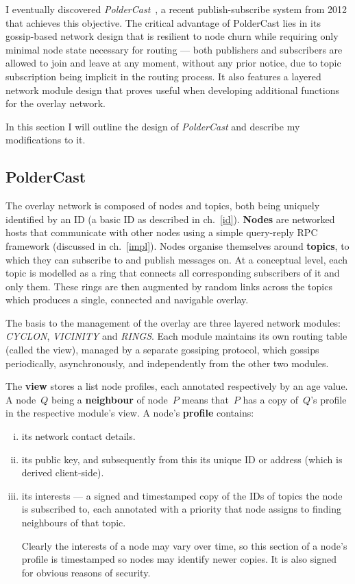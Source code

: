 \documentclass[10pt,a4paper,onecolumn]{article}
\begin{document}
I eventually discovered \textit{PolderCast}~\cite{poldercast}, a recent publish-subscribe system from 2012 that achieves this objective. The critical advantage of PolderCast lies in its gossip-based network design that is resilient to node churn while requiring only minimal node state necessary for routing — both publishers and subscribers are allowed to join and leave at any moment, without any prior notice, due to topic subscription being implicit in the routing process. It also features a layered network module design that proves useful when developing additional functions for the overlay network.

In this section I will outline the design of \textit{PolderCast} and describe my modifications to it.

\subsection{PolderCast}
The overlay network is composed of nodes and topics, both being uniquely identified by an ID (a basic ID as described in ch.~\ref{id}). \textbf{Nodes} are networked hosts that communicate with other nodes using a simple query-reply RPC framework (discussed in ch.~\ref{impl}). Nodes organise themselves around \textbf{topics}, to which they can subscribe to and publish messages on. At a conceptual level, each topic is modelled as a ring that connects all corresponding subscribers of it and only them. These rings are then augmented by random links across the topics which produces a single, connected and navigable overlay. 

The basis to the management of the overlay are three layered network modules: \emph{CYCLON}, \emph{VICINITY} and \emph{RINGS}. Each module maintains its own routing table (called the view), managed by a separate gossiping protocol, which gossips periodically, asynchronously, and independently from the other two modules.

The \textbf{view} stores a list node profiles, each annotated respectively by an age value. A node~$Q$ being a \textbf{neighbour} of node~$P$ means that~$P$ has a copy of~$Q$'s profile in the respective module's view. A node's \textbf{profile} contains:
\begin{enumerate}[i.]
\item its network contact details.
\item its public key, and subsequently from this its unique ID or address (which is derived client-side).
\item its interests — a signed and timestamped copy of the IDs of topics the node is subscribed to, each annotated with a priority that node assigns to finding neighbours of that topic. 

Clearly the interests of a node may vary over time, so this section of a node's profile is timestamped so nodes may identify newer copies. It is also signed for obvious reasons of security.
\end{enumerate}
\end{document}
